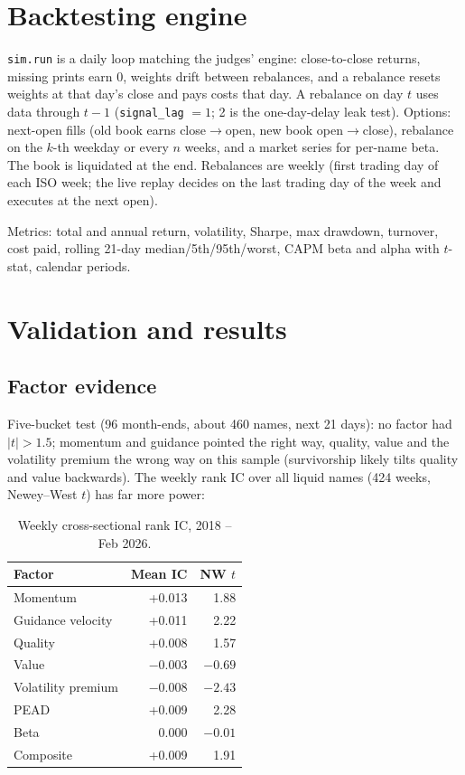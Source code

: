 \documentclass[11pt]{article}
\newcommand{\code}[1]{\texttt{#1}}
\begin{document}
\section{Backtesting engine}
\code{sim.run} is a daily loop matching the judges' engine: close-to-close returns, missing prints earn 0, weights drift
between rebalances, and a rebalance resets weights at that day's close and pays costs that day. A rebalance on day $t$
uses data through $t-1$ (\code{signal\_lag} $=1$; 2 is the one-day-delay leak test). Options: next-open fills
(old book earns close$\to$open, new book open$\to$close), rebalance on the $k$-th weekday or every $n$ weeks, and a
market series for per-name beta. The book is liquidated at the end. Rebalances are weekly (first trading day of each
ISO week; the live replay decides on the last trading day of the week and executes at the next open).

\noindent Metrics: total and annual return, volatility, Sharpe, max drawdown, turnover, cost paid, rolling 21-day
median/5th/95th/worst, CAPM beta and alpha with $t$-stat, calendar periods.

\section{Validation and results}

\subsection{Factor evidence}
Five-bucket test (96 month-ends, about 460 names, next 21 days): no factor had $|t|>1.5$; momentum and guidance pointed
the right way, quality, value and the volatility premium the wrong way on this sample (survivorship likely tilts
quality and value backwards). The weekly rank IC over all liquid names (424 weeks, Newey--West $t$) has far more power:

\begin{table}[H]\centering\small
\begin{tabular}{lrr}
\toprule
Factor & Mean IC & NW $t$ \\
\midrule
Momentum & +0.013 & 1.88 \\
Guidance velocity & +0.011 & 2.22 \\
Quality & +0.008 & 1.57 \\
Value & $-0.003$ & $-0.69$ \\
Volatility premium & $-0.008$ & $-2.43$ \\
PEAD & +0.009 & 2.28 \\
Beta & 0.000 & $-0.01$ \\
Composite & +0.009 & 1.91 \\
\bottomrule
\end{tabular}
\caption{Weekly cross-sectional rank IC, 2018 -- Feb 2026.}
\end{table}
\end{document}
